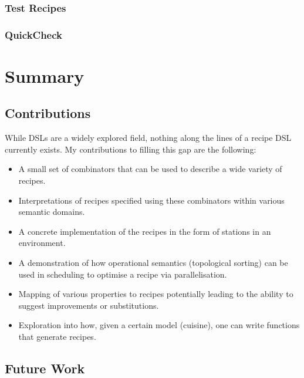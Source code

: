 \documentclass[11pt]{article}
\begin{document}
\subsubsection{Test Recipes}

\subsubsection{QuickCheck}

\section{Summary}

\subsection{Contributions}

While DSLs are a widely explored field, nothing along the lines of a recipe DSL
currently exists. My contributions to filling this gap are the following:

\begin{itemize}
    \item A small set of combinators that can be used to describe a wide variety of recipes.

    \item Interpretations of recipes specified using these combinators within various semantic domains.

    \item A concrete implementation of the recipes in the form of stations in an environment.

    \item A demonstration of how operational semantics (topological sorting) can be used in
    scheduling to optimise a recipe via parallelisation.

    \item Mapping of various properties to recipes potentially leading to the ability
    to suggest improvements or substitutions.

    \item Exploration into how, given a certain model (cuisine), one can write functions that
    generate recipes.
\end{itemize}

\subsection{Future Work}
\end{document}
